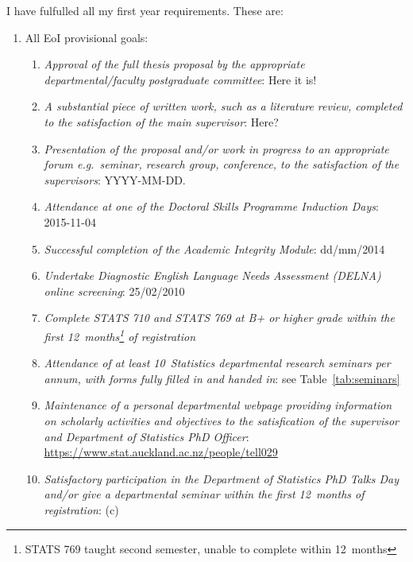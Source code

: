 \documentclass[12pt,a4paper]{article}
\begin{document}
I have fulfulled all my first year requirements.
These are:
\begin{enumerate}

\item
All EoI provisional goals:
\begin{enumerate}

\item
\textit{Approval of the full thesis proposal by the appropriate departmental/faculty postgraduate
committee}:
Here it is!

\item
\textit{A substantial piece of written work, such as a literature review, completed to the
satisfaction of the main supervisor}: Here?


\item
\textit{Presentation of the proposal and/or work in progress to an appropriate forum e.g.\ seminar,
research group, conference, to the satisfaction of the supervisors}:
YYYY-MM-DD.

\item
\textit{Attendance at one of the Doctoral Skills Programme
Induction Days}:
2015-11-04

\item
\textit{Successful completion of the Academic Integrity Module}:
dd/mm/2014

\item
\textit{Undertake Diagnostic English Language Needs Assessment (DELNA) online screening}:
25/02/2010

\item
\textit{Complete STATS 710 and STATS 769 at B+ or higher grade within the first 
12~months\footnote{STATS 769 taught second semester, unable to complete within 12~months}
of registration}

\item
\textit{Attendance of at least 10~Statistics departmental research seminars per annum, 
with forms fully filled in and handed in}:
see Table~\ref{tab:seminars}

\item
\textit{Maintenance of a personal departmental webpage providing information on scholarly
activities and objectives to the satisfication of the supervisor and Department of Statistics
PhD Officer}:
\url{https://www.stat.auckland.ac.nz/people/tell029}

\item
\textit{Satisfactory participation in the Department of Statistics PhD Talks Day and/or give
a departmental seminar within the first 12~months of registration}:
(c)



\end{enumerate}
\end{enumerate}
\end{document}
